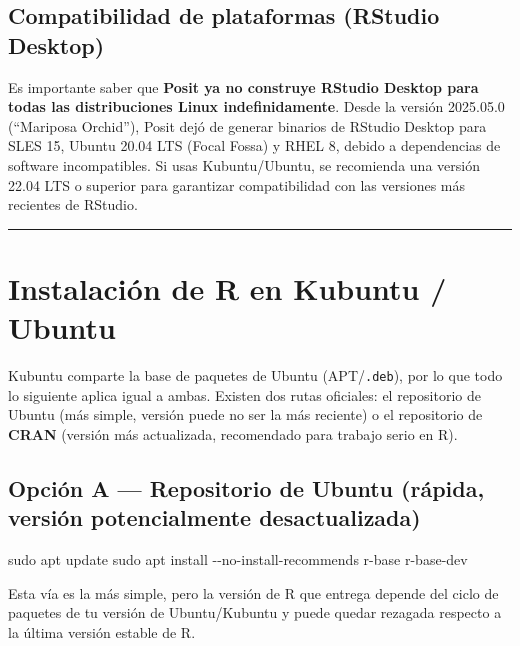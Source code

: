 \documentclass[
  man,
  floatsintext,
  longtable,
  a4paper,
  nolmodern,
  notxfonts,
  notimes,
  12pt,
  colorlinks=true,linkcolor=blue,citecolor=blue,urlcolor=blue]{apa7}
\newenvironment{Shaded}{\begin{snugshade}}{\end{snugshade}}
\newcommand{\AttributeTok}[1]{\textcolor[rgb]{0.40,0.45,0.13}{#1}}
\newcommand{\FunctionTok}[1]{\textcolor[rgb]{0.28,0.35,0.67}{#1}}
\newcommand{\NormalTok}[1]{\textcolor[rgb]{0.00,0.23,0.31}{#1}}
\begin{document}
\subsection{Compatibilidad de plataformas (RStudio
Desktop)}\label{compatibilidad-de-plataformas-rstudio-desktop}

Es importante saber que \textbf{Posit ya no construye RStudio Desktop
para todas las distribuciones Linux indefinidamente}. Desde la versión
2025.05.0 (``Mariposa Orchid''), Posit dejó de generar binarios de
RStudio Desktop para SLES 15, Ubuntu 20.04 LTS (Focal Fossa) y RHEL 8,
debido a dependencias de software incompatibles. Si usas Kubuntu/Ubuntu,
se recomienda una versión 22.04 LTS o superior para garantizar
compatibilidad con las versiones más recientes de RStudio.

\begin{center}\rule{0.5\linewidth}{0.5pt}\end{center}

\section{Instalación de R en Kubuntu /
Ubuntu}\label{instalaciuxf3n-de-r-en-kubuntu-ubuntu}

Kubuntu comparte la base de paquetes de Ubuntu (APT/\texttt{.deb}), por
lo que todo lo siguiente aplica igual a ambas. Existen dos rutas
oficiales: el repositorio de Ubuntu (más simple, versión puede no ser la
más reciente) o el repositorio de \textbf{CRAN} (versión más
actualizada, recomendado para trabajo serio en R).

\subsection{Opción A --- Repositorio de Ubuntu (rápida, versión
potencialmente
desactualizada)}\label{opciuxf3n-a-repositorio-de-ubuntu-ruxe1pida-versiuxf3n-potencialmente-desactualizada}

\begin{Shaded}
\begin{Highlighting}[]
\FunctionTok{sudo}\NormalTok{ apt update}
\FunctionTok{sudo}\NormalTok{ apt install }\AttributeTok{{-}{-}no{-}install{-}recommends}\NormalTok{ r{-}base r{-}base{-}dev}
\end{Highlighting}
\end{Shaded}

Esta vía es la más simple, pero la versión de R que entrega depende del
ciclo de paquetes de tu versión de Ubuntu/Kubuntu y puede quedar
rezagada respecto a la última versión estable de R.
\end{document}
